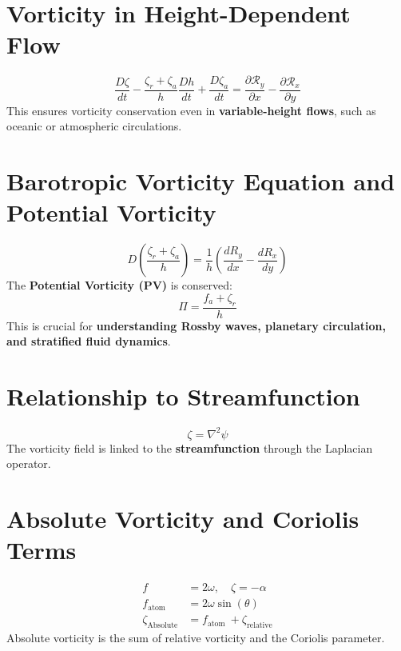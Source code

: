     \section{Vorticity in Height-Dependent Flow}
    \begin{equation}
        \frac{D \zeta}{d t} - \frac{ \zeta_r + \zeta_a }{h}  \frac{D h}{d t} + \frac{D \zeta_a}{d t}  = \frac{\partial \mathcal{R}_y}{\partial x} - \frac{\partial \mathcal{R}_x}{\partial y}
    \end{equation}
    This ensures vorticity conservation even in \textbf{variable-height flows}, such as oceanic or atmospheric circulations.

    \section{Barotropic Vorticity Equation and Potential Vorticity}
    \begin{equation}
        D\left(\frac{\zeta_r+\zeta_a}{h}\right)=\frac{1}{h}\left(\frac{d R_y}{d x}-\frac{d R_x}{d y}\right)
    \end{equation}
    The \textbf{Potential Vorticity (PV)} is conserved:
    \begin{equation}
        \Pi = \frac{f_a+\zeta_r}{h}
    \end{equation}
    This is crucial for \textbf{understanding Rossby waves, planetary circulation, and stratified fluid dynamics}.

    \section{Relationship to Streamfunction}
    \begin{equation}
        \zeta = \nabla^2 \psi
    \end{equation}
    The vorticity field is linked to the \textbf{streamfunction} through the Laplacian operator.

    \section{Absolute Vorticity and Coriolis Terms}
    \begin{align}
        f &= 2 \omega, \quad \zeta=-\alpha \\
        f_\text{atom} &= 2 \omega \sin (\theta) \\
        \zeta_\text{Absolute} &= f_\text{atom }+\zeta_\text{relative}
    \end{align}
    Absolute vorticity is the sum of relative vorticity and the Coriolis parameter.

